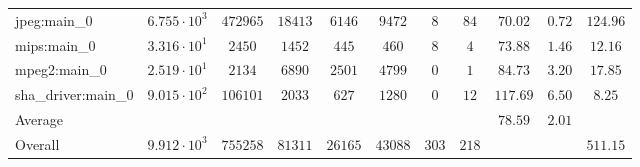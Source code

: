 \begin{tabular}{|l|c|c|c|c|c|c|c|c|c|c|}
jpeg:main\_0            & $ 6.755 \cdot 10^{3} $ & $ 472965 $ & $ 18413 $ & $ 6146  $ & $ 9472  $ & $ 8   $ & $ 84  $ & $ 70.02       $ & $ 0.72    $ & $ 124.96  $ \\
mips:main\_0            & $ 3.316 \cdot 10^{1} $ & $ 2450   $ & $ 1452  $ & $ 445   $ & $ 460   $ & $ 8   $ & $ 4   $ & $ 73.88       $ & $ 1.46    $ & $ 12.16   $ \\
mpeg2:main\_0           & $ 2.519 \cdot 10^{1} $ & $ 2134   $ & $ 6890  $ & $ 2501  $ & $ 4799  $ & $ 0   $ & $ 1   $ & $ 84.73       $ & $ 3.20    $ & $ 17.85   $ \\
sha\_driver:main\_0     & $ 9.015 \cdot 10^{2} $ & $ 106101 $ & $ 2033  $ & $ 627   $ & $ 1280  $ & $ 0   $ & $ 12  $ & $ 117.69      $ & $ 6.50    $ & $ 8.25    $ \\
\hline
Average                 & $                    $ & $        $ & $       $ & $       $ & $       $ & $     $ & $     $ & $ 78.59       $ & $ 2.01    $ & $         $ \\
\hline
Overall                 & $ 9.912 \cdot 10^{3} $ & $ 755258 $ & $ 81311 $ & $ 26165 $ & $ 43088 $ & $ 303 $ & $ 218 $ & $             $ & $         $ & $ 511.15  $ \\
\hline
\end{tabular}
